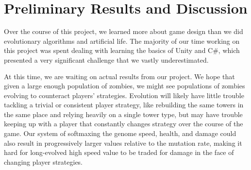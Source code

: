 \documentclass[letterpaper]{article}
\begin{document}


\section{Preliminary Results and Discussion}
Over the course of this project, we learned more about game design than we did
evolutionary algorithms and artificial life. The majority of our time working on
this project was spent dealing with learning the basics of Unity and C\#, which
presented a very significant challenge that we vastly underestimated.

At this time, we are waiting on actual results from our project.
We hope that given a large enough population of zombies, we might see
populations of zombies evolving to counteract players' strategies. Evolution
will likely have little trouble tackling a trivial or consistent player
strategy, like rebuilding the same towers in the same place and
relying heavily on a single tower type, but may have trouble keeping
up with a player that constantly changes strategy over the course of the game.
Our system of softmaxing the genome speed, health, and damage could also
result in progressively larger values relative to the mutation rate, making it
hard for long-evolved high speed value to be traded for damage in the face of
changing player strategies.
\end{document}
